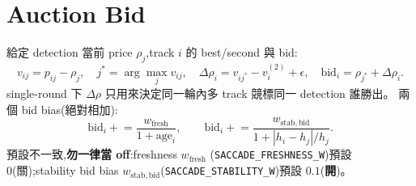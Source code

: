 \section{Auction Bid}\label{sec:au-bid}
給定 detection 當前 price \(\rho_j\),track \(i\) 的 best/second 與 bid:
\begin{equation}\label{eq:au-bid}
  v_{ij}=p_{ij}-\rho_j,\quad
  j^\ast=\arg\max_j v_{ij},\quad
  \Delta\rho_i=v_{ij^\ast}-v^{(2)}_i+\epsilon,\quad
  \mathrm{bid}_i=\rho_{j^\ast}+\Delta\rho_i.
\end{equation}
single-round 下 \(\Delta\rho\) 只用來決定同一輪內多 track 競標同一 detection 誰勝出。
兩個 bid bias(絕對相加):
\begin{equation}\label{eq:au-bias}
  \mathrm{bid}_i \mathrel{+}=\frac{w_{\mathrm{fresh}}}{1+\mathrm{age}_i},\qquad
  \mathrm{bid}_i \mathrel{+}=\frac{w_{\mathrm{stab,bid}}}{1+|h_i-h_j|/h_j}.
\end{equation}
預設不一致,\textbf{勿一律當 off}:freshness \(w_{\mathrm{fresh}}\)
(\texttt{SACCADE\_FRESHNESS\_W})預設 0(關);stability bid bias
\(w_{\mathrm{stab,bid}}\)(\texttt{SACCADE\_STABILITY\_W})預設 \(0.1\)(\textbf{開})。

